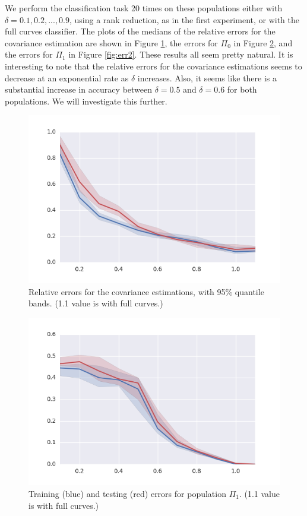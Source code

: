 \documentclass[10pt, a4paper]{article}
\theoremstyle{remark}
\begin{document}
We perform the classification task 20 times on these populations either with $\delta=0.1,0.2,...,0.9$, using a rank reduction, as in the first experiment, or with the full curves classifier. The plots of the medians of the relative errors for the covariance estimation are shown in Figure \ref{fig:coverr}, the errors for $\Pi_0$ in Figure \ref{fig:err1}, and the errors for $\Pi_1$ in Figure \ref{fig:err2}. These results all seem pretty natural. It is interesting to note that the relative errors for the covariance estimations seems to decrease at an exponential rate as $\delta$ increases. Also, it seems like there is a substantial increase in accuracy between $\delta=0.5$ and $\delta=0.6$ for both populations. We will investigate this further.
\begin{figure}[h]
\centering
\includegraphics[width=0.7\linewidth]{Code/report_images/coverr}
\caption{Relative errors for the covariance estimations, with 95\% quantile bands. (1.1 value is with full curves.)}
\label{fig:coverr}
\end{figure}
\begin{figure}
\centering
\includegraphics[width=0.7\linewidth]{Code/report_images/err1}
\caption{Training (blue) and testing (red) errors for population $\Pi_1$. (1.1 value is with full curves.)}
\label{fig:err1}
\end{figure}
\end{document}
